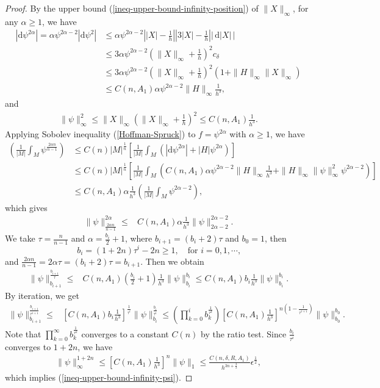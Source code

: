 \documentclass{amsart}
\numberwithin{equation}{section}
\theoremstyle{remark}
\renewcommand{\(}{\left(}
\renewcommand{\)}{\right)}
\renewcommand{\~}{\tilde}
\renewcommand{\-}{\overline}
\renewcommand{\a}{\alpha}
\renewcommand{\d}{\delta}
\newcommand{\e}{\epsilon}
\newcommand{\mrm}{\mathrm}
\begin{document}
\begin{proof}
	By the upper bound (\ref{ineq-upper-bound-infinity-position}) of $\|X\|_\infty$, for any $\a\geq 1$, we have
	\begin{align*}
	|\mrm{d}\psi^{2\a}|=\a \psi^{2\a-2} |\mrm{d}\psi^2|
	&\leq  \a \psi^{2\a-2} \left||X|-\frac{1}{h} \right| \left| 3|X|-\frac{1}{h} \right| \left|\,\mrm{d} |X|\,\right| \\
	&\leq  3\a \psi^{2\a-2} \(\|X\|_\infty+\frac{1}{h}\)^2  c_\d \\
	&\leq  3\a \psi^{2\a-2} \(\|X\|_\infty+\frac{1}{h}\)^2 (1+\|H\|_\infty \|X\|_\infty)\\
	&\leq  C(n,A_1)\a \psi^{2\a-2}\|H\|_\infty\frac{1}{h^3},
	\end{align*}
	and
	\begin{align*}
	\|\psi \|_\infty^2 \leq \|X\|_\infty\(\|X\|_\infty+\frac{1}{h}\)^2\leq C(n,A_1)\frac{1}{h^3}.
	\end{align*}
	Applying Sobolev inequality (\ref{Hoffman-Spruck}) to $f=\psi^{2\a}$ with $\a\geq 1$, we have
	\begin{align*}
	\(\frac{1}{|M|}\int_M \psi^{\frac{2 \a n}{n-1}} \) & \leq C(n)|M|^\frac{1}{n} \left[ \frac{1}{|M|}\int_M \( |\mrm{d}\psi^{2\a}|+|H|\psi^{2\a} \) \right]\\
	& \leq C(n)|M|^\frac{1}{n} \left[ \frac{1}{|M|}\int_M \( C(n,A_1)\a \psi^{2\a-2}\|H\|_\infty\frac{1}{h^3}+\|H\|_\infty \|\psi\|_\infty^2 \psi^{2\a-2} \) \right]\\
	& \leq C(n,A_1) \a \frac{1}{h^3}\( \frac{1}{|M|}\int_M \psi^{2\a-2} \),
	\end{align*}
	which gives
	\begin{align*}
	\|\psi\|_{\frac{2\a n}{n-1}}^{2\a} \leq & C(n,A_1) \a \frac{1}{h^3} \|\psi\|_{2\a-2}^{2\a-2}.
	\end{align*}
	We take $\tau=\frac{n}{n-1}$ and $\a=\frac{b_i}{2}+1$, where $b_{i+1}=(b_i+2)\tau$ and $b_0=1$, then
	$$
	b_i=(1+2n)\tau^{i}-2n\geq 1, \quad \text{for $i=0,1,\cdots$,}
	$$
	and $\frac{2\a n}{n-1}=2\a \tau= (b_i+2)\tau=b_{i+1}$. Then we obtain
	\begin{align*}
	\|\psi\|_{b_{i+1}}^{\frac{b_{i+1}}{\tau}} \leq & C(n,A_1) \(\frac{b_i}{2}+1\) \frac{1}{h^3} \|\psi\|_{b_i}^{b_i} \leq C(n,A_1)b_i\frac{1}{h^3} \|\psi\|_{b_i}^{b_i}.
	\end{align*}
	By iteration, we get
	\begin{align*}
	\|\psi\|_{b_{i+1}}^{\frac{b_{i+1}}{\tau^{i+1}}} \leq & \left[ C(n,A_1) b_i \frac{1}{h^3}\right]^{\frac{1}{\tau^i}}\|\psi\|^{\frac{b_i}{\tau^i}}_{b_i}
	\leq \(\prod_{k=0}^{i} b_k^{\frac{1}{\tau^k}}\)\left[ C(n,A_1)\frac{1}{h^3} \right]^{n\(1-\frac{1}{\tau^{i+1}}\)} \|\psi\|_{b_0}^{b_0}.
	\end{align*}
	Note that $\prod_{k=0}^{\infty} b_k^{\frac{1}{\tau^k}}$ converges to a constant $C(n)$ by the ratio test. Since $\frac{b_i}{\tau^i}$ converges to $1+2n$, we have
	\begin{align*}
	\|\psi\|_\infty^{1+2n} \leq \left[ C(n,A_1)\frac{1}{h^3} \right]^{n} \|\psi\|_1 \leq \frac{C(n,\d,R,A_1)}{h^{3n+\frac{3}{2}}}\e^\frac{1}{2},
	\end{align*}
	which implies (\ref{ineq-upper-bound-infinity-psi}).
\end{proof}
\end{document}
